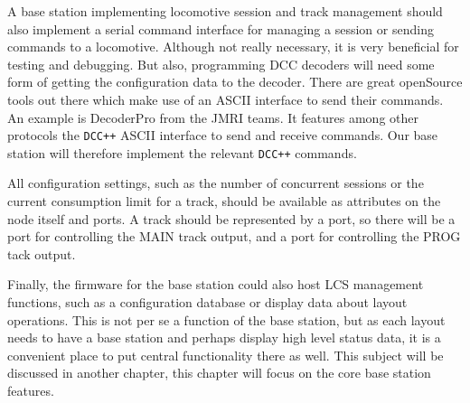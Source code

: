 A base station implementing locomotive session and track management should also implement a serial command interface for managing a session or sending commands to a locomotive. Although not really necessary, it is very beneficial for testing and debugging. But also, programming DCC decoders will need some form of getting the configuration data to the decoder. There are great openSource tools out there which make use of an ASCII interface to send their commands. An example is DecoderPro from the JMRI teams. It features among other protocols the \texttt{DCC++} ASCII interface to send and receive commands. Our base station will therefore implement the relevant \texttt{DCC++} commands.

All configuration settings, such as the number of concurrent sessions or the current consumption limit for a track, should be available as attributes on the node itself and ports. A track should be represented by a port, so there will be a port for controlling the MAIN track output, and a port for controlling the PROG tack output.

Finally, the firmware for the base station could also host LCS management functions, such as a configuration database or display data about layout operations. This is not per se a function of the base station, but as each layout needs to have a base station and perhaps display high level status data, it is a convenient place to put central functionality there as well. This subject will be discussed in another chapter, this chapter will focus on the core base station features.

